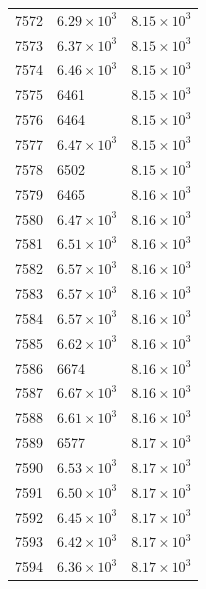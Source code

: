\begin{table}[H]
\begin{tabular}{lll}
7572 & $\displaystyle 6.29 \times 10^{3}$ & $\displaystyle 8.15 \times 10^{3}$ \\
7573 & $\displaystyle 6.37 \times 10^{3}$ & $\displaystyle 8.15 \times 10^{3}$ \\
7574 & $\displaystyle 6.46 \times 10^{3}$ & $\displaystyle 8.15 \times 10^{3}$ \\
7575 & 6461 & $\displaystyle 8.15 \times 10^{3}$ \\
7576 & 6464 & $\displaystyle 8.15 \times 10^{3}$ \\
7577 & $\displaystyle 6.47 \times 10^{3}$ & $\displaystyle 8.15 \times 10^{3}$ \\
7578 & 6502 & $\displaystyle 8.15 \times 10^{3}$ \\
7579 & 6465 & $\displaystyle 8.16 \times 10^{3}$ \\
7580 & $\displaystyle 6.47 \times 10^{3}$ & $\displaystyle 8.16 \times 10^{3}$ \\
7581 & $\displaystyle 6.51 \times 10^{3}$ & $\displaystyle 8.16 \times 10^{3}$ \\
7582 & $\displaystyle 6.57 \times 10^{3}$ & $\displaystyle 8.16 \times 10^{3}$ \\
7583 & $\displaystyle 6.57 \times 10^{3}$ & $\displaystyle 8.16 \times 10^{3}$ \\
7584 & $\displaystyle 6.57 \times 10^{3}$ & $\displaystyle 8.16 \times 10^{3}$ \\
7585 & $\displaystyle 6.62 \times 10^{3}$ & $\displaystyle 8.16 \times 10^{3}$ \\
7586 & 6674 & $\displaystyle 8.16 \times 10^{3}$ \\
7587 & $\displaystyle 6.67 \times 10^{3}$ & $\displaystyle 8.16 \times 10^{3}$ \\
7588 & $\displaystyle 6.61 \times 10^{3}$ & $\displaystyle 8.16 \times 10^{3}$ \\
7589 & 6577 & $\displaystyle 8.17 \times 10^{3}$ \\
7590 & $\displaystyle 6.53 \times 10^{3}$ & $\displaystyle 8.17 \times 10^{3}$ \\
7591 & $\displaystyle 6.50 \times 10^{3}$ & $\displaystyle 8.17 \times 10^{3}$ \\
7592 & $\displaystyle 6.45 \times 10^{3}$ & $\displaystyle 8.17 \times 10^{3}$ \\
7593 & $\displaystyle 6.42 \times 10^{3}$ & $\displaystyle 8.17 \times 10^{3}$ \\
7594 & $\displaystyle 6.36 \times 10^{3}$ & $\displaystyle 8.17 \times 10^{3}$ \\

\end{tabular}
\end{table}
